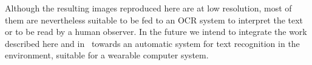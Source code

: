 \documentclass{article}
\begin{document}
Although the resulting images reproduced here are at low resolution, most of them are nevertheless suitable to be fed to an OCR system to interpret the text or to be read by a human observer.
In the future we intend to integrate the work described here and in~\cite{justin} towards an automatic system for text recognition in the environment, suitable for a wearable computer system.


% 


\end{document}
